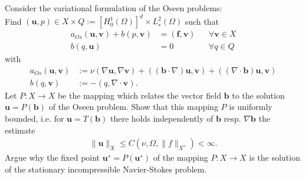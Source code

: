 \documentclass[12pt]{article}
\newcommand{\bu}{\boldsymbol{u}}
\newcommand{\bv}{\boldsymbol{v}}
\newenvironment{exercise}[2][Exercise]{\begin{trivlist}
\item[\hskip \labelsep {\bfseries #1}\hskip \labelsep {\bfseries #2.}]}{\end{trivlist}}
\begin{document}
\begin{exercise}{16}
Consider the variational formulation of the Oseen problems: \\
Find $(\bu, p) \in X \times Q := [H_0^1 (\Omega)]^d \times L^2_∗ (\Omega)$
such that
\begin{align*}
&&a_{Os} (\bu, \bv) + b(p, \bv) &= (\boldsymbol{f} , \bv) &&\forall \bv \in X&&\\
&&b(q, \bu) &= 0 &&\forall q \in Q&&
\end{align*}
with
\begin{align*}
a_{Os}(\bu, \bv) &:= \nu(\nabla \bu, \nabla \bv) + ((\boldsymbol{b} \cdot \nabla)\bu, \bv) + ( (\nabla \cdot \boldsymbol{b})\bu, \bv)\\
b(q, \bv) &:= −(q, \nabla \cdot \bv).
\end{align*}
Let $P : X \to X$ be the mapping which relates the vector field $\boldsymbol{b}$ to the solution $\bu = P (\boldsymbol{b})$
of the Oseen problem. Show that this mapping $P$ is uniformly bounded, i.e. for $\bu = T (\boldsymbol{b})$ there holds independently
of $\boldsymbol{b}$ resp. $\nabla \boldsymbol{b}$ the estimate
\begin{align*}
\|\bu\|_X \leq C(\nu, \Omega, \|f\|_{X^∗}) < \infty.
\end{align*}
Argue why the fixed point $\bu^∗ = P (\bu^∗ )$ of the mapping $P : X \to X$ is the solution of the stationary
incompressible Navier-Stokes problem.
\end{exercise}
\end{document}
